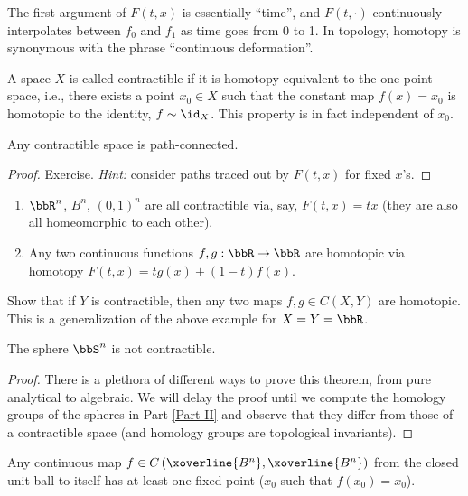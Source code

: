 The first argument of $F(t,x)$ is essentially ``time'', and $F(t,\cdot)$ continuously interpolates between $f_0$ and $f_1$ as time goes from 0 to 1. In topology, homotopy is synonymous with the phrase ``continuous deformation''.


\begin{defn}
    A space $X$ is called contractible if it is homotopy equivalent to the one-point space, i.e., there exists a point $x_0\in X$ such that the constant map $f(x)=x_0$ is homotopic to the identity, $f\sim \id_X$. This property is in fact independent of $x_0$.
\end{defn}
\begin{prop}
    Any contractible space is path-connected.
\end{prop}
\begin{proof}
    Exercise. \emph{Hint:} consider paths traced out by $F(t,x)$ for fixed $x$'s.
\end{proof}
\begin{example}
\begin{enumerate}
    \item $\bbR^n$, $B^n$, $(0,1)^n$ are all contractible via, say, $F(t,x)=tx$ (they are also all homeomorphic to each other).
    \item Any two continuous functions $f,g:\bbR \to\bbR $ are homotopic via homotopy $F(t,x)=tg(x)+(1-t)f(x)$.
\end{enumerate}
\end{example}
\begin{xca}
    Show that if $Y$ is contractible, then any two maps $f,g\in C(X,Y)$ are homotopic. This is a generalization of the above example for $X=Y=\bbR $.
\end{xca}
\begin{thm}[Brouwer]
    The sphere $\bbS^n$ is not contractible.
\end{thm}
\begin{proof}
    There is a plethora of different ways to prove this theorem, from pure analytical to algebraic. We will delay the proof until we compute the homology groups of the spheres in Part \ref{Part II} and observe that they differ from those of a contractible space (and homology groups are topological invariants).
\end{proof}
\begin{thm}\label{thm Brouwer's fixed point}
    Any continuous map $f\in C\left(\xoverline{B^n},\xoverline{B^n}\right)$  from the closed unit ball to itself has at least one fixed point ($x_0$ such that $f(x_0)=x_0$).
\end{thm}
